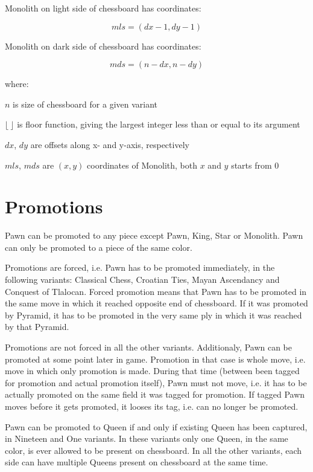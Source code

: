 Monolith on light side of chessboard has coordinates:

\begin{equation}
mls = (dx - 1, dy - 1)
\end{equation}

Monolith on dark side of chessboard has coordinates:

\begin{equation}
mds = (n - dx, n - dy)
\end{equation}

where:

$n$ is size of chessboard for a given variant

$\lfloor\ \rfloor$ is floor function, giving the largest integer less than or equal to its argument

$dx$, $dy$ are offsets along x- and y-axis, respectively

$mls$, $mds$ are $(x, y)$ coordinates of Monolith, both $x$ and $y$ starts from $0$

\clearpage %

\section*{Promotions}
\label{sec:Definitions/Promotions}

Pawn can be promoted to any piece except Pawn, King, Star or Monolith.
Pawn can only be promoted to a piece of the same color.

Promotions are forced, i.e. Pawn has to be promoted immediately, in the following
variants: Classical Chess, Croatian Ties, Mayan Ascendancy and Conquest of Tlalocan.
Forced promotion means that Pawn has to be promoted in the same move in which it
reached opposite end of chessboard. If it was promoted by Pyramid, it has to be
promoted in the very same ply in which it was reached by that Pyramid.

Promotions are not forced in all the other variants. Additionaly, Pawn can be promoted
at some point later in game. Promotion in that case is whole move, i.e. move in which
only promotion is made. During that time (between been tagged for promotion and actual
promotion itself), Pawn must not move, i.e. it has to be actually promoted on the same
field it was tagged for promotion. If tagged Pawn moves before it gets promoted, it
looses its tag, i.e. can no longer be promoted.

Pawn can be promoted to Queen if and only if existing Queen has been captured, in
Nineteen and One variants. In these variants only one Queen, in the same color, is
ever allowed to be present on chessboard. In all the other variants, each side can
have multiple Queens present on chessboard at the same time.


